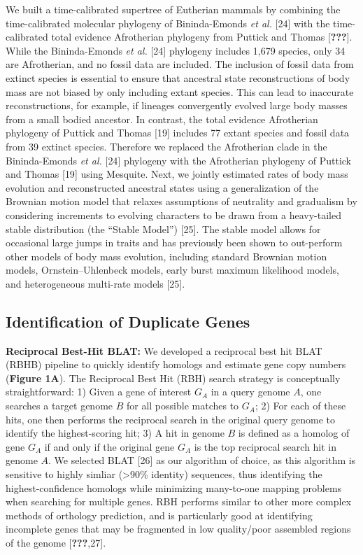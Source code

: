 \documentclass[10pt,letterpaper]{article}
\begin{document}
We built a time-calibrated supertree of Eutherian mammals by combining
the time-calibrated molecular phylogeny of Bininda-Emonds \emph{et al.}
{[}24{]} with the time-calibrated total evidence Afrotherian phylogeny
from Puttick and Thomas {[}{\textbf{???}}{]}. While the Bininda-Emonds
\emph{et al.} {[}24{]} phylogeny includes 1,679 species, only 34 are
Afrotherian, and no fossil data are included. The inclusion of fossil
data from extinct species is essential to ensure that ancestral state
reconstructions of body mass are not biased by only including extant
species. This can lead to inaccurate reconstructions, for example, if
lineages convergently evolved large body masses from a small bodied
ancestor. In contrast, the total evidence Afrotherian phylogeny of
Puttick and Thomas {[}19{]} includes 77 extant species and fossil data
from 39 extinct species. Therefore we replaced the Afrotherian clade in
the Bininda-Emonds \emph{et al.} {[}24{]} phylogeny with the Afrotherian
phylogeny of Puttick and Thomas {[}19{]} using Mesquite. Next, we
jointly estimated rates of body mass evolution and reconstructed
ancestral states using a generalization of the Brownian motion model
that relaxes assumptions of neutrality and gradualism by considering
increments to evolving characters to be drawn from a heavy-tailed stable
distribution (the ``Stable Model'') {[}25{]}. The stable model allows
for occasional large jumps in traits and has previously been shown to
out-perform other models of body mass evolution, including standard
Brownian motion models, Ornstein--Uhlenbeck models, early burst maximum
likelihood models, and heterogeneous multi-rate models {[}25{]}.

\hypertarget{identification-of-duplicate-genes}{%
\subsection{Identification of Duplicate
Genes}\label{identification-of-duplicate-genes}}

\textbf{Reciprocal Best-Hit BLAT:} We developed a reciprocal best hit
BLAT (RBHB) pipeline to quickly identify homologs and estimate gene copy
numbers (\textbf{Figure 1A}). The Reciprocal Best Hit (RBH) search
strategy is conceptually straightforward: 1) Given a gene of interest
\(G_A\) in a query genome \(A\), one searches a target genome \(B\) for
all possible matches to \(G_A\); 2) For each of these hits, one then
performs the reciprocal search in the original query genome to identify
the highest-scoring hit; 3) A hit in genome \(B\) is defined as a
homolog of gene \(G_A\) if and only if the original gene \(G_A\) is the
top reciprocal search hit in genome \(A\). We selected BLAT {[}26{]} as
our algorithm of choice, as this algorithm is sensitive to highly
simliar (\textgreater{}90\% identity) sequences, thus identifying the
highest-confidence homologs while minimizing many-to-one mapping
problems when searching for multiple genes. RBH performs similar to
other more complex methods of orthology prediction, and is particularly
good at identifying incomplete genes that may be fragmented in low
quality/poor assembled regions of the genome {[}{\textbf{???}},27{]}.
\end{document}
